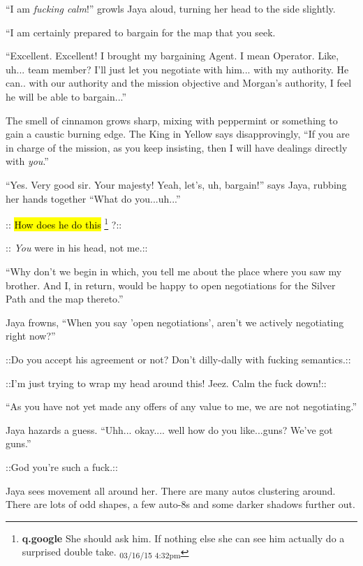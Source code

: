 ``I am\textit{ fucking calm}!'' growls Jaya aloud, turning her head to the side slightly.

``I am certainly prepared to bargain for the map that you seek.

``Excellent.  Excellent!  I brought my bargaining Agent.  I mean Operator.  Like, uh... team member?  I'll just let you negotiate with him... with my authority.  He can.. with our authority and the mission objective and Morgan's authority, I feel he will be able to bargain...''

The smell of cinnamon grows sharp, mixing with peppermint or something to gain a caustic burning edge.  The King in Yellow says disapprovingly, ``If you are in charge of the mission, as you keep insisting, then I will have dealings directly with \textit{you}.''

``Yes.  Very good sir.   Your majesty!  Yeah, let's, uh, bargain!'' says Jaya, rubbing her hands together  ``What do you...uh...''

 {\color[RGB]{255,0,0}::}  {\color[RGB]{255,0,0}\hl{How does he do this}} \footnote{\textbf{q.google }She should ask him.  If nothing else she can see him actually do a surprised double take. \textsubscript{03/16/15 4:32pm}} {\color[RGB]{255,0,0}?::} 

 {\color[RGB]{74,134,232}::} \textit{ {\color[RGB]{74,134,232}You} } {\color[RGB]{74,134,232} were in his head, not me.::} 

``Why don't we begin in which, you tell me about the place where you saw my brother.  And I, in return, would be happy to open negotiations for the Silver Path and the map thereto.''

Jaya frowns, ``When you say 'open negotiations', aren't we actively negotiating right now?''

 {\color[RGB]{74,134,232}::Do you accept his agreement or not?  Don't dilly-dally with fucking semantics.::} 

 {\color[RGB]{255,0,0}::I'm just trying to wrap my head around this! Jeez.  Calm the fuck down!::} 

``As you have not yet made any offers of any value to me, we are not negotiating.''

Jaya hazards a guess.  ``Uhh... okay.... well how do you like...guns?  We've got guns.''

 {\color[RGB]{74,134,232}::God you're such a fuck.::} 

Jaya sees movement all around her.  There are many autos clustering around. There are lots of odd shapes, a few auto-8s and some darker shadows further out.

